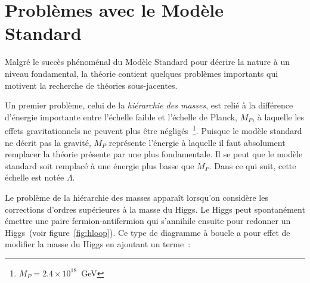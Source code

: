 



\section{Problèmes avec le Modèle Standard}
\label{sec:ms:problemes}

Malgré le succès phénoménal du Modèle Standard pour décrire la nature
à un niveau fondamental, la théorie contient quelques problèmes
importants qui motivent la recherche de théories sous-jacentes.

Un premier problème, celui de la \emph{hiérarchie des masses}, est
relié à la différence d'énergie importante entre l'échelle faible et
l'échelle de Planck, $M_P$, à laquelle les effets gravitationnels ne
peuvent plus être négligés~\footnote{$M_P = 2.4 \times 10^{18}$~GeV}. Puisque le modèle standard ne décrit pas la gravité,
$M_P$ représente l'énergie à laquelle il faut absolument remplacer la
théorie présente par une plus fondamentale. Il se peut que le modèle standard soit
remplacé à une énergie plus basse que $M_P$. Dans ce qui suit, cette échelle est notée $\Lambda$.

Le problème de la hiérarchie des masses apparaît lorsqu'on considère
les corrections d'ordres supérieures à la masse du Higgs. Le Higgs peut
spontanément émettre une paire fermion-antifermion qui s'annihile
ensuite pour redonner un Higgs~(voir figure~\ref{fig:hloop}). Ce type de diagramme à boucle a pour
effet de modifier la masse du Higgs en ajoutant un terme~\cite{martin_supersymmetry_1997}:

